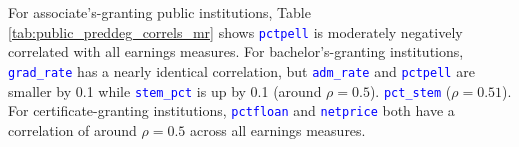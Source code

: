 \documentclass[12pt]{article}
\numberwithin{equation}{section}
\newcommand{\Varnm}[1]{\texttt{\textcolor{Blue}{#1}}}
\begin{document}
\begin{table}[ht!]
\caption{Correlations by primary degree granted (\Varnm{preddeg}) in public institutions}
\label{tab:public_preddeg_correls_mr}
\centering
{}
\end{table}

For associate's-granting public institutions, Table \ref{tab:public_preddeg_correls_mr} shows \Varnm{pctpell} is moderately negatively correlated with all earnings measures. For bachelor's-granting institutions, \Varnm{grad\_rate} has a nearly identical correlation, but \Varnm{adm\_rate} and \Varnm{pctpell} are smaller by 0.1 while \Varnm{stem\_pct} is up by 0.1 (around $\rho = 0.5$). \Varnm{pct\_stem} ($\rho = 0.51$). For certificate-granting institutions, \Varnm{pctfloan} and \Varnm{netprice} both have a correlation of around $\rho = 0.5$ across all earnings measures.
\end{document}
